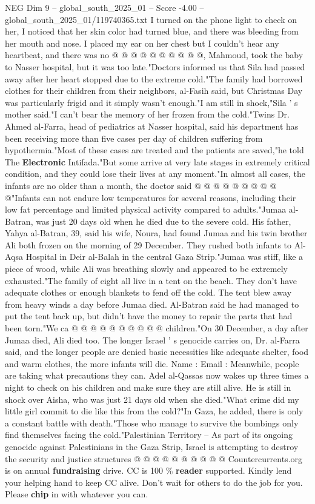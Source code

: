 \begin{textsample}{NEG Dim 9 – global\_south\_2025\_01 – Score -4.00 – global\_south\_2025\_01/119740365.txt}
I turned on the phone light to check on her, I noticed that her skin color had turned blue, and there was bleeding from her mouth and nose.
I placed my ear on her chest but I couldn't hear any heartbeat, and there was no @ @ @ @ @ @ @ @ @ @, Mahmoud, took the baby to Nasser hospital, but it was too late."Doctors informed us that Sila had passed away after her heart stopped due to the extreme cold."The family had borrowed clothes for their children from their neighbors, al-Fasih said, but Christmas Day was particularly frigid and it simply wasn't enough."I am still in shock,"Sila ' s mother said."I can't bear the memory of her frozen from the cold."Twins Dr.
Ahmed al-Farra, head of pediatrics at Nasser hospital, said his department has been receiving more than five cases per day of children suffering from hypothermia."Most of these cases are treated and the patients are saved,"he told The \textbf{Electronic} Intifada."But some arrive at very late stages in extremely critical condition, and they could lose their lives at any moment."In almost all cases, the infants are no older than a month, the doctor said @ @ @ @ @ @ @ @ @ @"Infants can not endure low temperatures for several reasons, including their low fat percentage and limited physical activity compared to adults."Jumaa al-Batran, was just 20 days old when he died due to the severe cold.
His father, Yahya al-Batran, 39, said his wife, Noura, had found Jumaa and his twin brother Ali both frozen on the morning of 29 December.
They rushed both infants to Al-Aqsa Hospital in Deir al-Balah in the central Gaza Strip."Jumaa was stiff, like a piece of wood, while Ali was breathing slowly and appeared to be extremely exhausted."The family of eight all live in a tent on the beach.
They don't have adequate clothes or enough blankets to fend off the cold.
The tent blew away from heavy winds a day before Jumaa died.
Al-Batran said he had managed to put the tent back up, but didn't have the money to repair the parts that had been torn."We ca @ @ @ @ @ @ @ @ @ @ children."On 30 December, a day after Jumaa died, Ali died too.
The longer Israel ' s genocide carries on, Dr. al-Farra said, and the longer people are denied basic necessities like adequate shelter, food and warm clothes, the more infants will die.
Name : Email : Meanwhile, people are taking what precautions they can.
Adel al-Qassas now wakes up three times a night to check on his children and make sure they are still alive.
He is still in shock over Aisha, who was just 21 days old when she died."What crime did my little girl commit to die like this from the cold?"In Gaza, he added, there is only a constant battle with death."Those who manage to survive the bombings only find themselves facing the cold."Palestinian Territory -- As part of its ongoing genocide against Palestinians in the Gaza Strip, Israel is attempting to destroy the security and justice structures @ @ @ @ @ @ @ @ @ @ Countercurrents.org is on annual \textbf{fundraising} drive.
CC is 100 \% \textbf{reader} supported.
Kindly lend your helping hand to keep CC alive.
Don't wait for others to do the job for you.
Please \textbf{chip} in with whatever you can.

\end{textsample}
